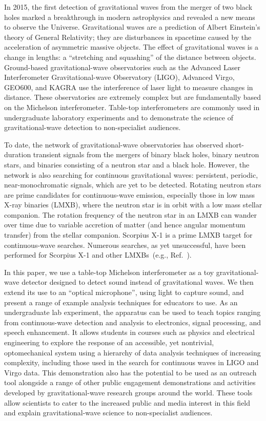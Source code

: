 \documentclass[paper-main.tex]{subfiles}
\begin{document}
In 2015, the first detection of gravitational waves from the merger of two black holes marked a breakthrough in modern astrophysics and revealed a new means to observe the Universe.\cite{GW150914}
Gravitational waves are a prediction of Albert Einstein's theory of General Relativity; they are disturbances in spacetime caused by the acceleration of asymmetric massive objects.
The effect of gravitational waves is a change in lengths: a ``stretching and squashing'' of the distance between objects. 
Ground-based gravitational-wave observatories such as the Advanced Laser Interferometer Gravitational-wave Observatory (LIGO), Advanced Virgo, GEO600, and KAGRA use the interference of laser light to measure changes in distance. 
These observatories are extremely complex but are fundamentally based on the Michelson interferometer. 
Table-top interferometers are commonly used in undergraduate laboratory experiments and to demonstrate the science of gravitational-wave detection to non-specialist audiences.\cite{TTExhibit:2021}


To date, the network of gravitational-wave observatories has observed short-duration transient signals from the mergers of binary black holes, binary neutron stars, and binaries consisting of a neutron star and a black hole.\cite{GWTC-2:2020,NSBH:2021}
However, the network is also searching for continuous gravitational waves: persistent, periodic, near-monochromatic signals, which are yet to be detected. 
Rotating neutron stars are prime candidates for continuous-wave emission, especially those in low mass X-ray binaries (LMXB), where the neutron star is in orbit with a low mass stellar companion.
The rotation frequency of the neutron star in an LMXB can wander over time due to variable accretion of matter (and hence angular momentum transfer) from the stellar companion.\cite{xraybinaries:1997}
Scorpius X-1 is a prime LMXB target for continuous-wave searches. 
Numerous searches, as yet unsuccessful, have been performed for Scorpius X-1 and other LMXBs~(e.g., Ref.~\cite{ScoX1O2Viterbi:2019}). 


In this paper, we use a table-top Michelson interferometer as a toy gravitational-wave detector designed to detect sound instead of gravitational waves. 
We then extend its use to an ``optical microphone'', using light to capture sound, and present a range of example analysis techniques for educators to use. 
As an undergraduate lab experiment, the apparatus can be used to teach topics ranging from continuous-wave detection and analysis to electronics, signal processing, and speech enhancement.
It allows students in courses such as physics and electrical engineering to explore the response of an accessible, yet nontrivial, optomechanical system using a hierarchy of data analysis techniques of increasing complexity, including those used in the search for continuous waves in LIGO and Virgo data.\cite{SuvorovaEtAl:2017, ScoX1O2Viterbi:2019} 
This demonstration also has the potential to be used as an outreach tool alongside a range of other public engagement demonstrations and activities developed by gravitational-wave research groups around the world. 
These tools allow scientists to cater to the increased public and media interest in this field and explain gravitational-wave science to non-specialist audiences.
\end{document}
